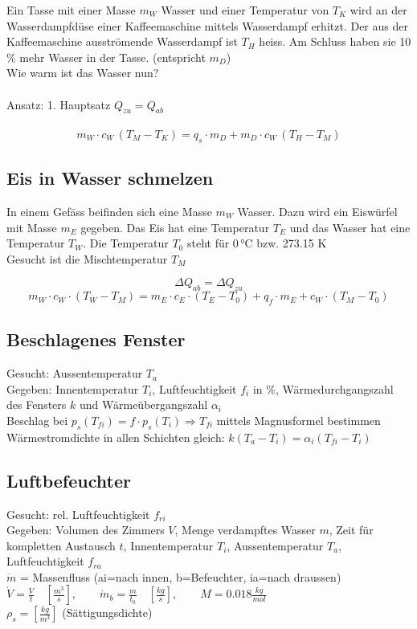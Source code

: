 Ein Tasse mit einer Masse $m_W$ Wasser und einer Temperatur von $T_K$ wird an
der Wasserdampfdüse einer Kaffeemaschine mittels Wasserdampf erhitzt. Der aus der
Kaffeemaschine ausströmende Wasserdampf ist $T_H$ heiss. Am Schluss haben sie 10 \%
mehr Wasser in der Tasse. (entspricht $m_D$)\\
Wie warm ist das Wasser nun? \\
\\
Ansatz: 1. Hauptsatz \quad $Q_{zu} = Q_{ab}$ \\
\\
$$ m_W \cdot c_W \, (T_M - T_K) = q_s \cdot m_D + m_D \cdot c_W \, (T_H - T_M) $$



\subsection{Eis in Wasser schmelzen}

In einem Gefäss beifinden sich eine Masse $m_W$ Wasser. Dazu wird ein Eiswürfel mit Masse $m_E$ gegeben. Das Eis hat eine Temperatur $T_E$ und das Wasser hat eine Temperatur $T_W$. Die Temperatur $T_0$ steht für $0 \, \text{°C}$ bzw. 273.15 K \\
Gesucht ist die Mischtemperatur $T_M$ 

$$ \Delta Q_{ab} = \Delta Q_{zu}$$
$$ m_W \cdot c_W \cdot (T_W - T_M) = m_E \cdot c_E \cdot (T_E - T_0) + q_f \cdot m_E + c_W \cdot (T_M - T_0) $$

\subsection{Beschlagenes Fenster}

Gesucht: Aussentemperatur $T_a$\\
Gegeben: Innentemperatur $T_i$, Luftfeuchtigkeit $f_i$ in $\%$, 
Wärmedurchgangszahl des Fensters $k$ und Wärmeübergangszahl $\alpha_i$\\

Beschlag bei $p_s(T_{fi}) = f \cdot p_s(T_i) \Rightarrow T_{fi} $ mittels Magnusformel bestimmen\\

Wärmestromdichte in allen Schichten gleich: $k(T_a - T_i) = \alpha_i(T_{fi} - T_i)$

\subsection{Luftbefeuchter}
Gesucht: rel. Luftfeuchtigkeit $f_{ri}$ \\
Gegeben: Volumen des Zimmers $V$, Menge verdampftes Wasser $m$, Zeit für kompletten Austausch $t$, Innentemperatur $T_i$, Aussentemperatur $T_a$, Luftfeuchtigkeit $f_{ra}$\\
$\dot{m}$ = Massenfluss (ai=nach innen, b=Befeuchter, ia=nach draussen)\\
$\dot{V} = \frac{V}{t} \quad [\frac{m^3}{s}] , \quad \quad \dot{m}_b = \frac{m}{t_0} \quad [\frac{kg}{s}], \quad \quad  M = \text{0.018} \frac{kg}{mol}$\\ 
$\rho_s = [\frac{kg}{m^3}]$ (Sättigungsdichte)

